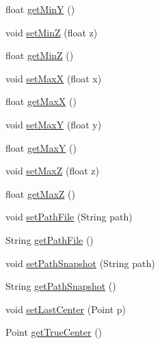 \begin{DoxyCompactItemize}
float \hyperlink{classandroid_1_1app_1_1printerapp_1_1viewer_1_1_data_storage_a63ba78d4b12ad32a05f3a1aee1706467}{get\+MinY} ()
\item 
void \hyperlink{classandroid_1_1app_1_1printerapp_1_1viewer_1_1_data_storage_a863c48d404c78b27483557f256ce2e1c}{set\+MinZ} (float z)
\item 
float \hyperlink{classandroid_1_1app_1_1printerapp_1_1viewer_1_1_data_storage_a4966d28515fcb1b7a9192545f3ed3e9f}{get\+MinZ} ()
\item 
void \hyperlink{classandroid_1_1app_1_1printerapp_1_1viewer_1_1_data_storage_a8f781e7e878414cbde6e56f384b97105}{set\+MaxX} (float x)
\item 
float \hyperlink{classandroid_1_1app_1_1printerapp_1_1viewer_1_1_data_storage_a090efa6a982fd4341edfffffcd56eb9b}{get\+MaxX} ()
\item 
void \hyperlink{classandroid_1_1app_1_1printerapp_1_1viewer_1_1_data_storage_a6816ea7f8d08e3cb1aeb14e7e9a983be}{set\+MaxY} (float y)
\item 
float \hyperlink{classandroid_1_1app_1_1printerapp_1_1viewer_1_1_data_storage_a5f10b91f8872dc74000bfad9bab8412b}{get\+MaxY} ()
\item 
void \hyperlink{classandroid_1_1app_1_1printerapp_1_1viewer_1_1_data_storage_a97b8839377e24662b1ec98a96efe419e}{set\+MaxZ} (float z)
\item 
float \hyperlink{classandroid_1_1app_1_1printerapp_1_1viewer_1_1_data_storage_a077d978b1dfb2d0a7398286558b1637c}{get\+MaxZ} ()
\item 
void \hyperlink{classandroid_1_1app_1_1printerapp_1_1viewer_1_1_data_storage_a8f8da792b9339faf3921e30ea6fac325}{set\+Path\+File} (String path)
\item 
String \hyperlink{classandroid_1_1app_1_1printerapp_1_1viewer_1_1_data_storage_aafdfee670aa24ffccd833d37c2a43a43}{get\+Path\+File} ()
\item 
void \hyperlink{classandroid_1_1app_1_1printerapp_1_1viewer_1_1_data_storage_a6c5a0b9a3445c98516b5b5b16b2e6297}{set\+Path\+Snapshot} (String path)
\item 
String \hyperlink{classandroid_1_1app_1_1printerapp_1_1viewer_1_1_data_storage_afa190888e59aae3fe408a2719c8b8f06}{get\+Path\+Snapshot} ()
\item 
void \hyperlink{classandroid_1_1app_1_1printerapp_1_1viewer_1_1_data_storage_aa53abcd5293f9fdc822ae1cb05512c89}{set\+Last\+Center} (Point p)
\item 
Point \hyperlink{classandroid_1_1app_1_1printerapp_1_1viewer_1_1_data_storage_ab513d274dcf838eba49abc2f40359fbc}{get\+True\+Center} ()

\end{DoxyCompactItemize}

